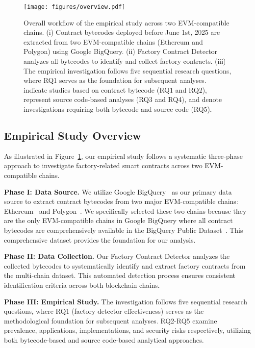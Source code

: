\documentclass[acmsmall, screen]{acmart}
\begin{document}
	\begin{figure}[t]
		\centering
		\texttt{[image: figures/overview.pdf]}
		\caption{Overall workflow of the empirical study across two EVM-compatible chains. (i) Contract
		bytecodes deployed before June 1st, 2025 are extracted from two EVM-compatible chains (Ethereum
		and Polygon) using Google BigQuery. (ii) Factory Contract Detector analyzes all bytecodes to
		identify and collect factory contracts. (iii) The empirical investigation follows five
		sequential research questions, where RQ1 serves as the foundation for subsequent analyses.
		 indicate studies based on contract
		bytecode (RQ1 and RQ2),  represent
		source code-based analyses (RQ3 and RQ4), and 
		denote investigations requiring both bytecode and source code (RQ5).}
		\label{fig:workflow}
	\end{figure}

	\subsection{Empirical Study Overview}
	As illustrated in Figure~\ref{fig:workflow}, our empirical study follows a systematic three-phase
	approach to investigate factory-related smart contracts across two EVM-compatible chains.

	\textbf{Phase I: Data Source.} We utilize Google BigQuery~\cite{googlebigquery} as our primary
	data source to extract contract bytecodes from two major EVM-compatible chains: Ethereum~\cite{ethereum}
	and Polygon~\cite{polygon}. We specifically selected these two chains because they are the only
	EVM-compatible chains in Google BigQuery where all contract bytecodes are comprehensively
	available in the BigQuery Public Dataset~\cite{bigquery-public-datasets}. This comprehensive dataset
	provides the foundation for our analysis.

	\textbf{Phase II: Data Collection.} Our Factory Contract Detector analyzes the collected
	bytecodes to systematically identify and extract factory contracts from the multi-chain dataset.
	This automated detection process ensures consistent identification criteria across both blockchain
	chains.

	\textbf{Phase III: Empirical Study.} The investigation follows five sequential research
	questions, where RQ1 (factory detector effectiveness) serves as the methodological foundation for
	subsequent analyses. RQ2-RQ5 examine prevalence, applications, implementations, and security risks
	respectively, utilizing both bytecode-based and source code-based analytical approaches.
\end{document}
